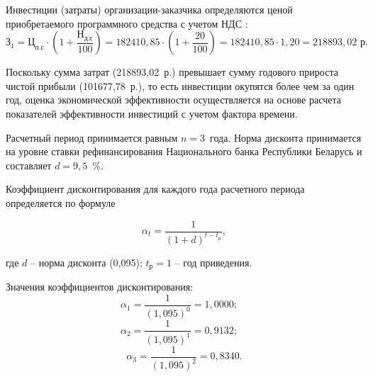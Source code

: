 \numberedparagraph
Инвестиции (затраты) организации-заказчика определяются ценой приобретаемого программного средства с учетом НДС \cite{Economics}:
$$
    \text{З}_1 = \text{Ц}_{\text{п.с}} \cdot \left(1 + \frac{\text{Н}_{\text{д.с}}}{100}\right) = 182410{,}85 \cdot \left(1 + \frac{20}{100}\right) = 182410{,}85 \cdot 1{,}20 = 218893{,}02 \text{ р}.
$$

Поскольку сумма затрат (218893{,}02~р.) превышает сумму годового прироста чистой прибыли (101677{,}78~р.), то есть инвестиции окупятся более чем за один год, оценка экономической эффективности осуществляется на основе расчета показателей эффективности инвестиций с учетом фактора времени.

Расчетный период принимается равным $n = 3$~года. Норма дисконта принимается на уровне ставки рефинансирования Национального банка Республики Беларусь и составляет $d = 9{,}5$~\%.

Коэффициент дисконтирования для каждого года расчетного периода определяется по формуле

\begin{equation}
    \alpha_t = \frac{1}{(1+d)^{t-t_{\text{р}}}},
\end{equation}

где $d$ -- норма дисконта (0{,}095); $t_{\text{р}} = 1$ -- год приведения.

Значения коэффициентов дисконтирования:
$$
    \alpha_1 = \frac{1}{(1{,}095)^{0}} = 1{,}0000; \quad 
$$
$$
    \alpha_2 = \frac{1}{(1{,}095)^{1}} = 0{,}9132; \quad
$$
$$
    \alpha_3 = \frac{1}{(1{,}095)^{2}} = 0{,}8340.
$$

